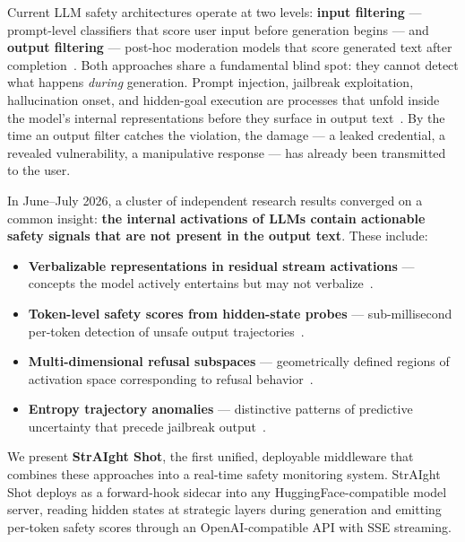 \documentclass[11pt]{article}
\begin{document}
Current LLM safety architectures operate at two levels: \textbf{input filtering} — prompt-level classifiers that score user input before generation begins — and \textbf{output filtering} — post-hoc moderation models that score generated text after completion~\cite{llamaguard,wildguard}. Both approaches share a fundamental blind spot: they cannot detect what happens \emph{during} generation. Prompt injection, jailbreak exploitation, hallucination onset, and hidden-goal execution are processes that unfold inside the model's internal representations before they surface in output text~\cite{anthropic2026workspace}. By the time an output filter catches the violation, the damage — a leaked credential, a revealed vulnerability, a manipulative response — has already been transmitted to the user.

In June--July 2026, a cluster of independent research results converged on a common insight: \textbf{the internal activations of LLMs contain actionable safety signals that are not present in the output text}. These include:

\begin{itemize}[nosep]
    \item \textbf{Verbalizable representations in residual stream activations} — concepts the model actively entertains but may not verbalize~\cite{anthropic2026workspace}.
    \item \textbf{Token-level safety scores from hidden-state probes} — sub-millisecond per-token detection of unsafe output trajectories~\cite{hiddensstate2026}.
    \item \textbf{Multi-dimensional refusal subspaces} — geometrically defined regions of activation space corresponding to refusal behavior~\cite{rfm2026}.
    \item \textbf{Entropy trajectory anomalies} — distinctive patterns of predictive uncertainty that precede jailbreak output~\cite{entropy2026}.
\end{itemize}

We present \textbf{StrAIght Shot}, the first unified, deployable middleware that combines these approaches into a real-time safety monitoring system. StrAIght Shot deploys as a forward-hook sidecar into any HuggingFace-compatible model server, reading hidden states at strategic layers during generation and emitting per-token safety scores through an OpenAI-compatible API with SSE streaming.
\end{document}

